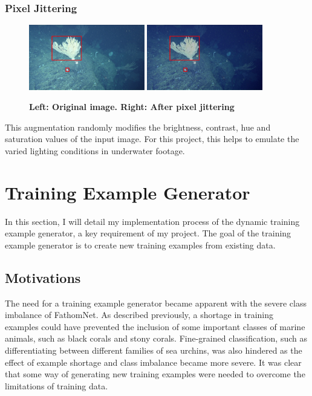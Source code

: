 \documentclass[12pt,a4paper,twoside,openany]{report}
\begin{document}
\subsubsection{Pixel Jittering}
\begin{figure}[H]
    \centering
    \includegraphics[width=0.45\textwidth]{figs/implementation/aug/before.png}
    \hfill
    \includegraphics[width=0.45\textwidth]{figs/implementation/aug/jitter.png}
    \caption{\textbf{Left: Original image. Right: After pixel jittering}}
    \label{fig:aug_jitter}
\end{figure}
This augmentation randomly modifies the brightness, contrast, hue and saturation values of the input image. For this project, this helps to emulate the varied lighting conditions in underwater footage.
\section{Training Example Generator} \label{section: exgen}
In this section, I will detail my implementation process of the dynamic training example generator, a key requirement of my project. The goal of the training example generator is to create new training examples from existing data.

\subsection{Motivations}
The need for a training example generator became apparent with the severe class imbalance of FathomNet. As described previously, a shortage in training examples could have prevented the inclusion of some important classes of marine animals, such as black corals and stony corals. Fine-grained classification, such as differentiating between different families of sea urchins, was also hindered as the effect of example shortage and class imbalance became more severe. It was clear that some way of generating new training examples were needed to overcome the limitations of training data.
\end{document}
